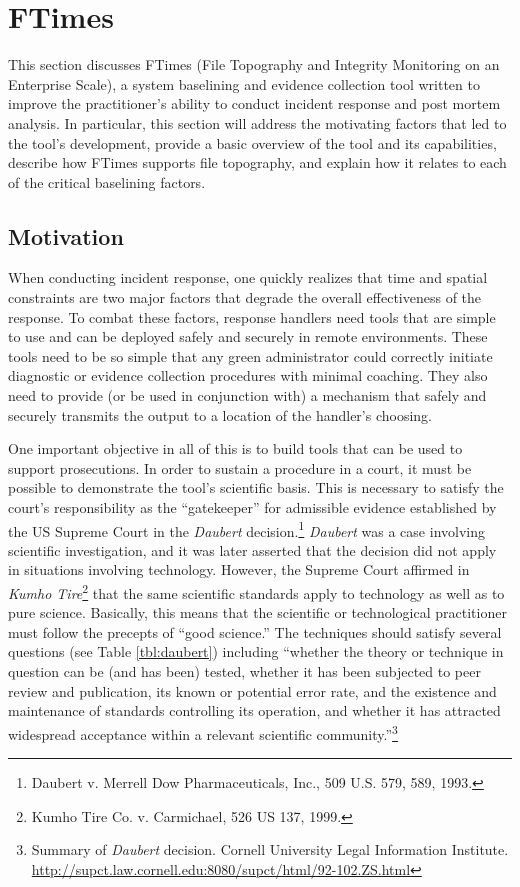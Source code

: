 \documentclass[10pt]{article}
\begin{document}
\section{FTimes}

This section discusses FTimes (File Topography and Integrity
Monitoring on an Enterprise Scale), a system baselining and evidence
collection tool written to improve the practitioner's ability to
conduct incident response and post mortem analysis.  In particular,
this section will address the motivating factors that led to the
tool's development, provide a basic overview of the tool and its
capabilities, describe how FTimes supports file topography, and
explain how it relates to each of the critical baselining factors.

\subsection{Motivation}

When conducting incident response, one quickly realizes that time and
spatial constraints are two major factors that degrade the overall
effectiveness of the response.  To combat these factors, response
handlers need tools that are simple to use and can be deployed safely
and securely in remote environments.  These tools need to be so simple
that any green administrator could correctly initiate diagnostic or
evidence collection procedures with minimal coaching.  They also need
to provide (or be used in conjunction with) a mechanism that safely
and securely transmits the output to a location of the handler's
choosing.

One important objective in all of this is to build tools that can be
used to support prosecutions.  In order to sustain a procedure in a
court, it must be possible to demonstrate the tool's scientific basis.
This is necessary to satisfy the court's responsibility as the
``gatekeeper'' for admissible evidence established by the US Supreme
Court in the {\it Daubert} decision.\footnote{Daubert v.  Merrell Dow
Pharmaceuticals, Inc., 509 U.S. 579, 589, 1993.} {\it Daubert} was a
case involving scientific investigation, and it was later asserted
that the decision did not apply in situations involving technology.
However, the Supreme Court affirmed in {\it Kumho Tire}\footnote{Kumho
Tire Co. v. Carmichael, 526 US 137, 1999.} that the same scientific
standards apply to technology as well as to pure science.  Basically,
this means that the scientific or technological practitioner must
follow the precepts of ``good science.'' The techniques should satisfy
several questions (see Table \ref{tbl:daubert}) including ``whether
the theory or technique in question can be (and has been) tested,
whether it has been subjected to peer review and publication, its
known or potential error rate, and the existence and maintenance of
standards controlling its operation, and whether it has attracted
widespread acceptance within a relevant scientific
community.''\footnote{Summary of {\it Daubert} decision.  Cornell
University Legal Information Institute.\newline
\url{http://supct.law.cornell.edu:8080/supct/html/92-102.ZS.html}}
\end{document}
